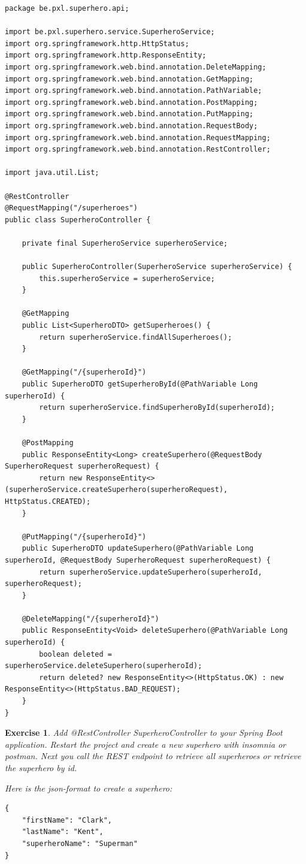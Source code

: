 \documentclass[a4paper, 12pt]{report}
\newenvironment{boxexercise}
{\begin{tcolorbox}
[enhanced jigsaw,breakable,pad at break*=1mm,
 colback=tsyellow!20,boxrule=0pt,frame hidden]}
{\end{tcolorbox}}
\newtheorem{envoefening}{\textbf{Exercise}}[chapter]
\newenvironment{oefening}
               {\begin{boxexercise}\begin{envoefening}}
               {\end{envoefening}\end{boxexercise}}
\begin{document}
\begin{lstlisting}[frame=single]
package be.pxl.superhero.api;

import be.pxl.superhero.service.SuperheroService;
import org.springframework.http.HttpStatus;
import org.springframework.http.ResponseEntity;
import org.springframework.web.bind.annotation.DeleteMapping;
import org.springframework.web.bind.annotation.GetMapping;
import org.springframework.web.bind.annotation.PathVariable;
import org.springframework.web.bind.annotation.PostMapping;
import org.springframework.web.bind.annotation.PutMapping;
import org.springframework.web.bind.annotation.RequestBody;
import org.springframework.web.bind.annotation.RequestMapping;
import org.springframework.web.bind.annotation.RestController;

import java.util.List;

@RestController
@RequestMapping("/superheroes")
public class SuperheroController {

	private final SuperheroService superheroService;

	public SuperheroController(SuperheroService superheroService) {
		this.superheroService = superheroService;
	}

	@GetMapping
	public List<SuperheroDTO> getSuperheroes() {
		return superheroService.findAllSuperheroes();
	}

	@GetMapping("/{superheroId}")
	public SuperheroDTO getSuperheroById(@PathVariable Long superheroId) {
		return superheroService.findSuperheroById(superheroId);
	}
	
	@PostMapping
	public ResponseEntity<Long> createSuperhero(@RequestBody SuperheroRequest superheroRequest) {
		return new ResponseEntity<>(superheroService.createSuperhero(superheroRequest), HttpStatus.CREATED);
	}
	
	@PutMapping("/{superheroId}")
	public SuperheroDTO updateSuperhero(@PathVariable Long superheroId, @RequestBody SuperheroRequest superheroRequest) {
		return superheroService.updateSuperhero(superheroId, superheroRequest);
	}
	
	@DeleteMapping("/{superheroId}")
	public ResponseEntity<Void> deleteSuperhero(@PathVariable Long superheroId) {
		boolean deleted = superheroService.deleteSuperhero(superheroId);
		return deleted? new ResponseEntity<>(HttpStatus.OK) : new ResponseEntity<>(HttpStatus.BAD_REQUEST);
	}
}
\end{lstlisting}

\begin{oefening}
Add @RestController SuperheroController to your Spring Boot application.  Restart the project and create a new superhero with insomnia or postman.  Next you call the REST endpoint to retrieve all superheroes or retrieve the superhero by id. 

Here is the json-format to create a superhero:
\begin{lstlisting}
{
	"firstName": "Clark",
	"lastName": "Kent",
	"superheroName": "Superman"
}
\end{lstlisting}
\end{oefening}
\end{document}
